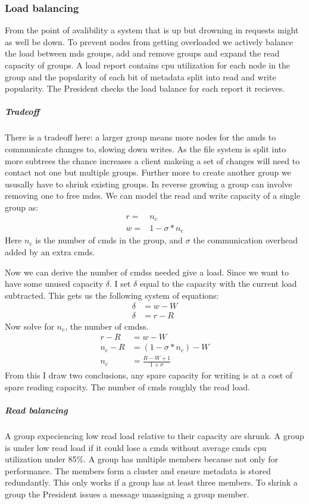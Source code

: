 \subsubsection*{Load balancing} \label{sec:loadb}
From the point of avalibility a system that is up but drowning in requests might as well be down. To prevent nodes from getting overloaded we actively balance the load between \ac{mds} groups, add and remove groups and expand the read capacity of groups. A load report contains cpu utilization for each node in the group and the popularity of each bit of metadata split into read and write popularity. The President checks the load balance for each report it recieves.
%
\subparagraph*{Tradeoff}
There is a tradeoff here: a larger group means more nodes for the \ac{amds} to communicate changes to, slowing down writes. As the file system is split into more subtrees the chance increases a client makeing a set of changes will need to contact not one but multiple groups. Further more to create another group we ususally have to shrink existing groups. In reverse growing a group can involve removing one to free \acp{mds}. 
%
We can model the read and write capacity of a single group as:
\begin{align}
	r =& n_\text{c} \\
	w =& 1 - \sigma*n_\text{c}
\end{align}%
Here $n_\text{c}$ is the number of \ac{cmds} in the group, and $\sigma$ the communication overhead added by an extra \ac{cmds}. 

Now we can derive the number of \acp{cmds} needed give a load. Since we want to have some unused capacity $\delta$. I set $\delta$ equal to the capacity with the current load subtracted. This gets us the following system of equations: 
\begin{align}
	\delta &= w - W \\
	\delta &= r - R
\end{align}%
Now solve for $n_\text{c}$, the number of \acp{cmds}.
\begin{align}
	r - R &= w - W \\
	n_c - R &= \left(1 - \sigma*n_c\right) - W \\
	n_c &= \frac{R - W + 1}{1 + \sigma}
\end{align}
From this I draw two conclusions, any spare capacity for writing is at a cost of spare reading capacity. The number of \ac{cmds} roughly the read load.
%
%
\subparagraph*{Read balancing}
A group expeciencing low read load relative to their capacity are shrunk. A group is under low read load if it could lose a \ac{cmds} without average \ac{cmds} cpu utilization under 85\%. A group has multiple members because not only for performance. The members form a \praft{} cluster and ensure metadata is stored redundantly. This only works if a group has at least three members. To shrink a group the President issues a \raft{} message unassigning a group member. 


